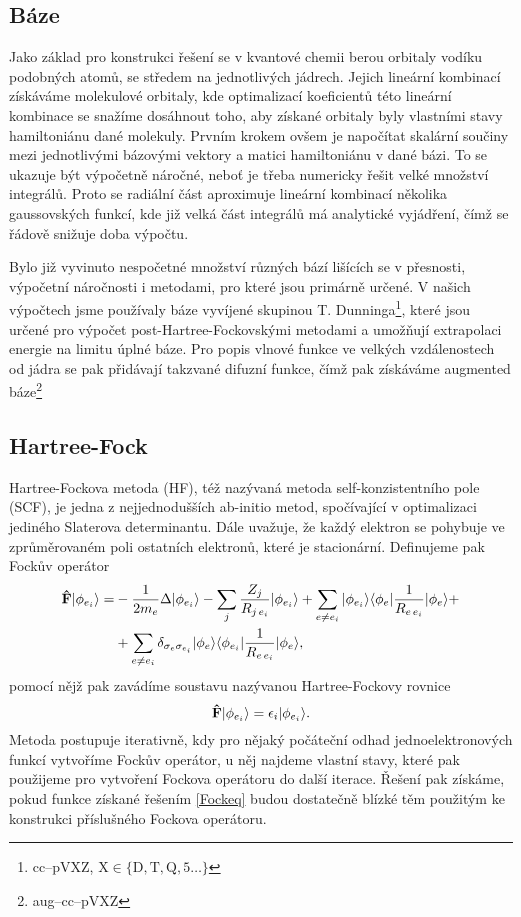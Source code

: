 \subsection{Báze}
Jako základ pro konstrukci řešení se v kvantové chemii berou orbitaly vodíku podobných 
atomů, se středem na jednotlivých jádrech. Jejich lineární kombinací získáváme 
molekulové orbitaly, kde optimalizací koeficientů této lineární kombinace se snažíme 
dosáhnout toho, aby získané orbitaly byly vlastními stavy hamiltoniánu dané molekuly.
Prvním krokem ovšem je napočítat skalární součiny mezi jednotlivými bázovými vektory a 
matici hamiltoniánu v dané bázi. To se ukazuje být výpočetně náročné, neboť je třeba 
numericky řešit velké množství integrálů. Proto se radiální část aproximuje lineární 
kombinací několika gaussovských funkcí, kde již velká část integrálů má analytické 
vyjádření, čímž se řádově snižuje doba výpočtu.

Bylo již vyvinuto nespočetné množství různých bází lišících se v přesnosti, výpočetní 
náročnosti i metodami, pro které jsou primárně určené.
V našich výpočtech jsme používaly báze vyvíjené 
skupinou T. Dunninga\footnote{cc--pVXZ,  $\mathrm{ X \in \{D,T,Q,5\dots\}}$}\cite{Dunning-basis}, 
které jsou určené pro výpočet post-Hartree-Fockovskými metodami a umožňují extrapolaci 
energie na limitu úplné báze.
Pro popis vlnové funkce ve velkých vzdálenostech od jádra se pak přidávají takzvané 
difuzní funkce, čímž pak získáváme augmented báze\footnote{aug--cc--pVXZ}

\subsection{Hartree-Fock}
Hartree-Fockova metoda (HF), též nazývaná metoda self-konzistentního pole (SCF), je jedna z 
nejjednodušších ab-initio metod, spočívající v optimalizaci jediného Slaterova 
determinantu. Dále uvažuje, že každý elektron se pohybuje ve zprůměrovaném poli 
ostatních elektronů, které je stacionární.
Definujeme pak Fockův operátor
\begin{equation}
\begin{split}
\mathbf{\hat{F}}| \phi_{e_i} \rangle =& -\frac{1}{2m_e}\Delta| \phi_{e_i} \rangle
-\sum_{j} \frac{Z_{j}}{R_{j\,e_i}}| \phi_{e_i} \rangle
+ \sum_{e \neq e_i} | \phi_{e_i} \rangle\langle \phi_{e} | \frac{1}{R_{e\,e_i}} | \phi_{e} \rangle
+\\
&+ \sum_{e \neq e_i} \delta_{\sigma_e \sigma_{e_i}}| \phi_{e} \rangle\langle \phi_{e_i} | \frac{1}{R_{e\,e_i}} | \phi_{e} \rangle,
\end{split}
\end{equation} 
pomocí nějž pak zavádíme soustavu nazývanou Hartree-Fockovy rovnice
\begin{equation}
\mathbf{\hat{F}}| \phi_{e_i} \rangle = \epsilon_i | \phi_{e_i} \rangle.\label{Fockeq}
\end{equation}
Metoda postupuje iterativně, kdy pro nějaký počáteční odhad jednoelektronových funkcí 
vytvoříme Fockův operátor, u něj najdeme vlastní stavy, které pak použijeme pro 
vytvoření Fockova operátoru do další iterace.
Řešení pak získáme, pokud funkce získané řešením \eqref{Fockeq} budou dostatečně blízké 
těm použitým ke konstrukci příslušného Fockova operátoru.

